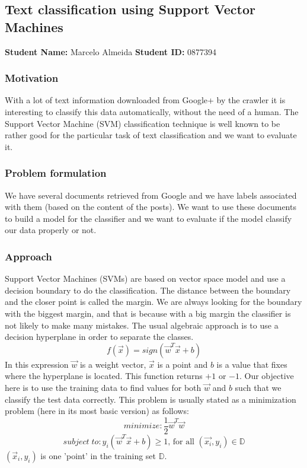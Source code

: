 \subsection{Text classification using Support Vector Machines}
\textbf{Student Name: }Marcelo Almeida \textbf{Student ID:} 0877394 \\

\subsubsection*{Motivation}
With a lot of text information downloaded from Google+ by the crawler it is interesting to classify this data automatically, without the need of a human. The Support Vector Machine (SVM) classification technique is well known to be rather good for the particular task of text classification and we want to evaluate it.


\subsubsection*{Problem formulation}
We have several documents retrieved from Google and we have labels associated with them (based on the content of the posts). We want to use these documents to build a model for the classifier and we want to evaluate if the model classify our data properly or not.


\subsubsection*{Approach}
Support Vector Machines (SVMs) are based on vector space model and use a decision boundary to do the classification. The distance between the boundary and the closer point is called the margin. We are always looking for the boundary with the biggest margin, and that is because with a big margin the classifier is not likely to make many mistakes. The usual algebraic approach is to use a decision hyperplane in order to separate the classes.
$$ f(\vec{x}) = sign(\vec{w}^{T} \vec{x} + b) $$
In this expression $\vec{w}$ is a weight vector, $ \vec{x}$ is a point and $b$ is a value that fixes where the hyperplane is located. This function returns $+1$ or $-1$. Our objective here is to use the training data to find values for both $\vec{w}$ and $b$ such that we classify the test data correctly. This problem is usually stated as a minimization problem (here in its most basic version) as follows:
$$ minimize: \dfrac{1}{2} \vec{w}^{T} \vec{w} $$
$$ subject \; to: y_{i}(\vec{w}^{T} \vec{x} + b) \geq 1 \text{, for all }(\vec{x_{i}},y_{i}) \in \mathbb{D} $$
$(\vec{x}_{i}, y_{i})$ is one 'point' in the training set $\mathbb{D}$.


